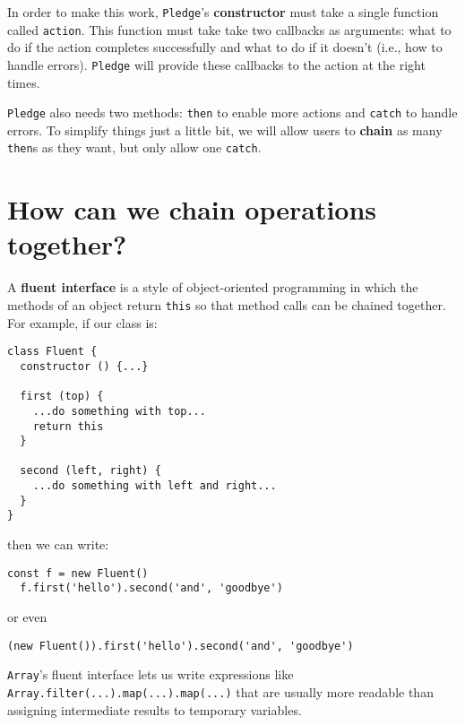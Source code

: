 \documentclass[krantzl]{krantz}
\newcommand{\glossref}[1]{\textbf{#1}}
\begin{document}
In order to make this work,
\texttt{Pledge}'s \glossref{constructor} must take a single function called \texttt{action}.
This function must take take two callbacks as arguments:
what to do if the action completes successfully
and what to do if it doesn't (i.e., how to handle errors).
\texttt{Pledge} will provide these callbacks to the action at the right times.


\texttt{Pledge} also needs two methods:
\texttt{then} to enable more actions
and \texttt{catch} to handle errors.
To simplify things just a little bit,
we will allow users to \glossref{chain} as many \texttt{then}s as they want,
but only allow one \texttt{catch}.

\section{How can we chain operations together?}\label{async-programming-fluent}


A \glossref{fluent interface}
is a style of object-oriented programming
in which the methods of an object return \texttt{this}
so that method calls can be chained together.
For example,
if our class is:

\begin{lstlisting}[frame=single,frameround=tttt]
class Fluent {
  constructor () {...}

  first (top) {
    ...do something with top...
    return this
  }

  second (left, right) {
    ...do something with left and right...
  }
}
\end{lstlisting}


\noindent then we can write:

\begin{lstlisting}[frame=single,frameround=tttt]
  const f = new Fluent()
  f.first('hello').second('and', 'goodbye')
\end{lstlisting}


\noindent or even

\begin{lstlisting}[frame=single,frameround=tttt]
  (new Fluent()).first('hello').second('and', 'goodbye')
\end{lstlisting}


\texttt{Array}'s fluent interface lets us write expressions like
\texttt{Array.filter(...).map(...).map(...)}
that are usually more readable than assigning intermediate results to temporary variables.
\end{document}
